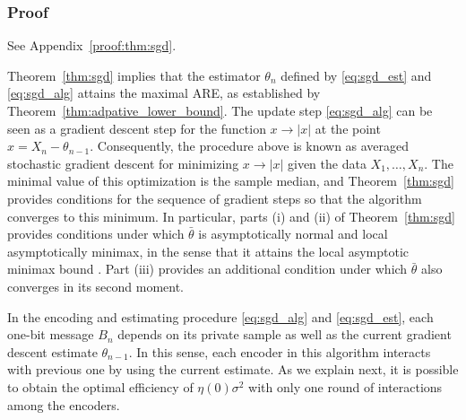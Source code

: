 \documentclass[letterpaper, 11pt]{IEEEtran}      %
\begin{document}
\subsubsection*{Proof}
See Appendix~\ref{proof:thm:sgd}. \par

Theorem~\ref{thm:sgd} implies that the estimator ${\theta}_n$ defined by \eqref{eq:sgd_est} and \eqref{eq:sgd_alg} attains the maximal ARE, as established by Theorem~\ref{thm:adpative_lower_bound}. %
%
The update step \eqref{eq:sgd_alg} can be seen as a gradient descent step for the function $x\to |x|$ at the point $x=X_n - \theta_{n-1}$. Consequently, the procedure above is known as averaged stochastic gradient descent for minimizing $x \to |x|$ given the data $X_1,\ldots,X_n$. The minimal value of this optimization is the sample median, and Theorem~\ref{thm:sgd} provides conditions for the sequence of gradient steps so that the algorithm converges to this minimum. In particular, parts (i) and (ii) of Theorem~\ref{thm:sgd} provides conditions under which $\bar{\theta}$ is asymptotically normal and local asymptotically minimax, in the sense that it attains the local asymptotic minimax bound \cite{van2000asymptotic}. Part (iii) provides an additional condition under which $\bar{\theta}$ also converges in its second moment. 
 \par
In the encoding and estimating procedure \eqref{eq:sgd_alg} and \eqref{eq:sgd_est}, each one-bit message $B_n$ depends on its private sample as well as the current gradient descent estimate $\theta_{n-1}$. In this sense, each encoder in this algorithm interacts with previous one by using the current estimate.
%
As we explain next, 
it is possible to obtain the optimal efficiency of $\eta(0)\sigma^2$ with only one round of interactions among the encoders. 
\end{document}
